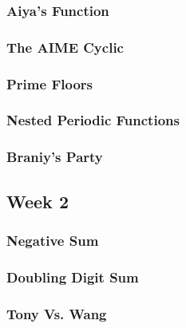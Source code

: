 \documentclass[titlepage=true]{scrartcl}
\begin{document}
        \subsubsection{Aiya's Function}
            \label{6-1-3}
            
        \newpage

        \subsubsection{The AIME Cyclic}
            \label{6-1-4}
            
        \newpage

        \subsubsection{Prime Floors}
            \label{6-1-5}
            
        \newpage

        \subsubsection{Nested Periodic Functions}
            \label{6-1-6}
            

        \subsubsection{Braniy's Party}
            \label{6-1-7}
            
        \newpage

    \subsection{Week 2}

        \subsubsection{Negative Sum}
            \label{6-2-1}
            
        \newpage

        \subsubsection{Doubling Digit Sum}
            \label{6-2-2}
            
        \newpage

        \subsubsection{Tony Vs. Wang}
            \label{6-2-3}
            
        \newpage 
        
\end{document}
